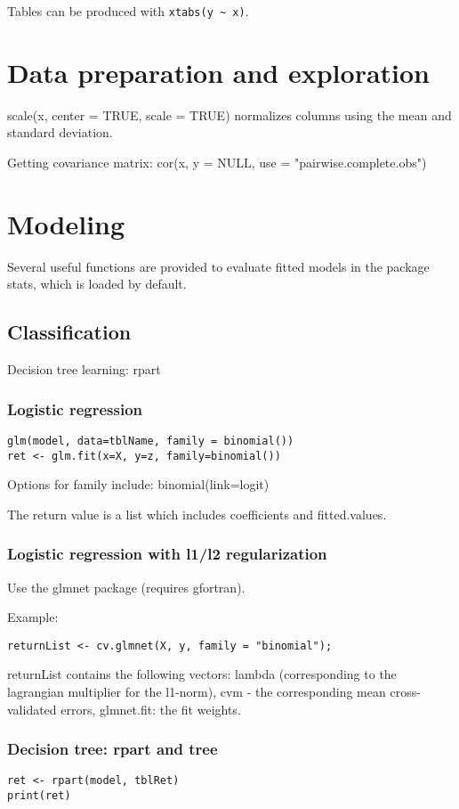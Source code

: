 \documentclass[oneside, article]{memoir}
\begin{document}
Tables can be produced with \verb'xtabs(y ~ x)'.

\section{Data preparation and exploration}
scale(x, center = TRUE, scale = TRUE) normalizes columns using the mean and standard deviation.

Getting covariance matrix: cor(x, y = NULL, use = "pairwise.complete.obs")

\section{Modeling}
Several useful functions are provided to evaluate fitted models in the package stats, which is loaded by default.



\subsection{Classification}
Decision tree learning: rpart

\subsubsection{Logistic regression}
\begin{verbatim}
glm(model, data=tblName, family = binomial())
ret <- glm.fit(x=X, y=z, family=binomial())

\end{verbatim}
Options for family include: binomial(link=logit)

The return value is a list which includes coefficients and fitted.values.


\subsubsection{Logistic regression with l1/l2 regularization}
Use the glmnet package (requires gfortran).

Example:
\begin{verbatim}
returnList <- cv.glmnet(X, y, family = "binomial");
\end{verbatim}

returnList contains the following vectors: lambda (corresponding to the lagrangian multiplier for the l1-norm), cvm - the corresponding mean cross-validated errors, glmnet.fit: the fit weights.

\subsubsection{Decision tree: rpart and tree}
\begin{verbatim}
ret <- rpart(model, tblRet)
print(ret)
\end{verbatim}
\end{document}
